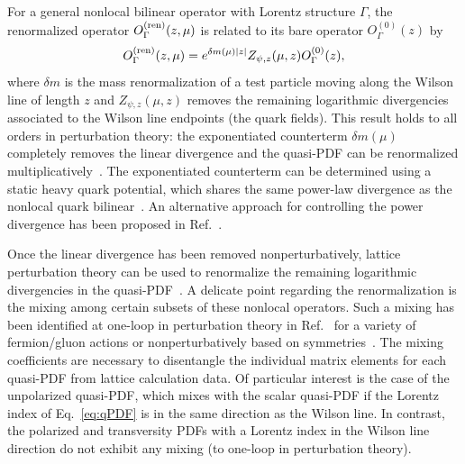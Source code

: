 \begin{itemize}
For a general nonlocal bilinear operator with Lorentz structure $\Gamma$, 
the renormalized operator $O_{\Gamma}^{\rm (ren)}(z,\mu)$ is related to its bare 
operator $O^{(0)}_{\Gamma}(z)$ by~\cite{Dotsenko:1979wb,Arefeva:1980zd, 
Craigie:1980qs,Stefanis:1983ke,Dorn:1986dt}
\begin{equation}\label{eq:renorm_non-local}
O_{\Gamma}^{\rm (ren)}(z,\mu)=e^{\delta m(\mu)|z|}Z_{\psi, z}(\mu,z)O^{(0)}_{\Gamma}(z),
\end{equation}
where $\delta m$ is the mass renormalization of a test particle moving along 
the Wilson line of length $z$ and $Z_{\psi, z}(\mu,z)$ removes the remaining 
logarithmic divergencies associated to the Wilson line endpoints 
(the quark fields). 
%
This result holds to all orders in perturbation theory: the exponentiated 
counterterm $\delta m(\mu)$ completely removes the linear divergence and the 
quasi-PDF can be renormalized 
multiplicatively~\cite{Ji:2017oey,Ishikawa:2017faj}. 
%
The exponentiated counterterm can be determined using a static heavy quark 
potential, which shares the same power-law divergence as the nonlocal quark 
bilinear~\cite{Musch:2010ka,Ishikawa:2016znu,Chen:2016fxx,Green:2017xeu}. 
%
An alternative approach for controlling the power divergence has been proposed 
in Ref.~\cite{Monahan:2016bvm}.

Once the linear divergence has been removed nonperturbatively, lattice 
perturbation theory can be used to renormalize the remaining logarithmic
divergencies in the quasi-PDF~\cite{Ishikawa:2016znu,Chen:2016fxx,
Carlson:2017gpk,Xiong:2017jtn}. 
%
A delicate point regarding the renormalization is the mixing among certain 
subsets of these nonlocal operators. 
%
Such a mixing has been identified at 
one-loop in perturbation theory in Ref.~\cite{Constantinou:2017sej} 
for a variety of fermion/gluon actions or nonperturbatively based on 
symmetries~\cite{Chen:2017mzz,Chen:2017mie}. 
%
The mixing coefficients are necessary to disentangle the individual matrix 
elements for each quasi-PDF from lattice calculation data. 
%
Of particular interest is the case of the unpolarized quasi-PDF, which mixes 
with the scalar quasi-PDF if the Lorentz index of Eq.~\eqref{eq:qPDF} is in the 
same direction as the Wilson line. 
%
In contrast, the polarized and transversity PDFs with a Lorentz index in the 
Wilson line direction do not exhibit any mixing (to one-loop in 
perturbation theory). 


\end{itemize}

